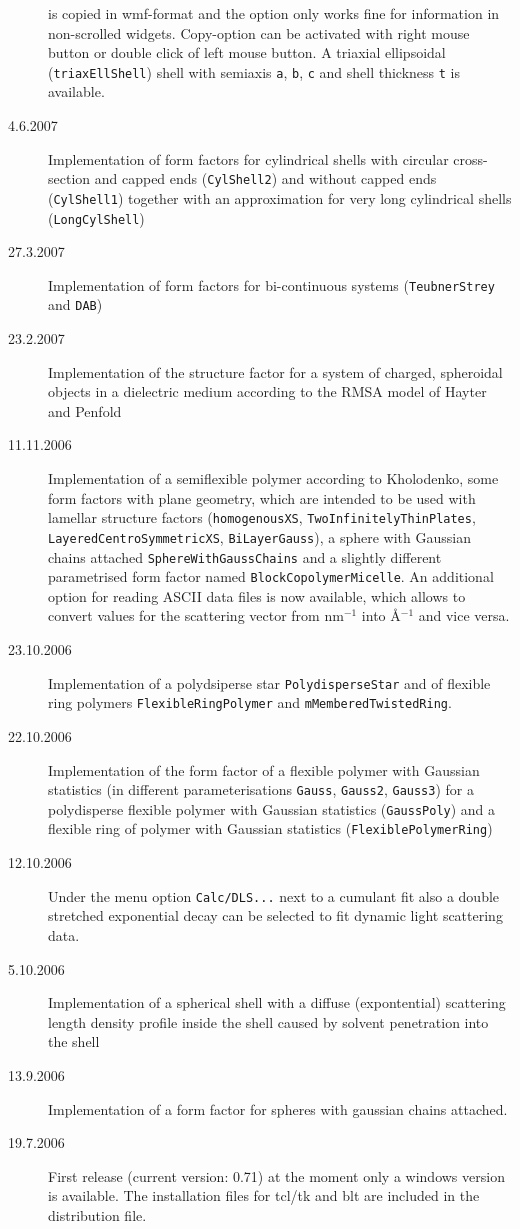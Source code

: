 \begin{description}
    is copied in wmf-format and the option only works fine for information in non-scrolled widgets.
    Copy-option can be activated with right mouse button or double click of left mouse button.
    A triaxial ellipsoidal (\texttt{triaxEllShell}) shell with semiaxis \texttt{a}, \texttt{b}, \texttt{c}
    and shell thickness \texttt{t} is available.
    \item[4.6.2007] Implementation of form factors for cylindrical shells with circular cross-section and capped ends
    (\texttt{CylShell2}) and without capped ends (\texttt{CylShell1}) together with an approximation for very long
    cylindrical shells (\texttt{LongCylShell})
    \item[27.3.2007] Implementation of form factors for bi-continuous systems (\texttt{TeubnerStrey} and \texttt{DAB})
    \item[23.2.2007] Implementation of the structure factor for a system of charged, spheroidal objects in a
    dielectric medium according to the RMSA model of Hayter and Penfold
    \item[11.11.2006]  Implementation of a semiflexible polymer according to Kholodenko,
    some form factors with plane geometry, which are intended to be used with lamellar structure factors
    (\texttt{homogenousXS}, \texttt{TwoInfinitelyThinPlates},
     \texttt{LayeredCentroSymmetricXS}, \texttt{BiLayerGauss}), a sphere with Gaussian chains attached
    \texttt{SphereWithGaussChains} and a slightly different parametrised form factor named
    \texttt{BlockCopolymerMicelle}.
    An additional option for reading ASCII data files is now available,
    which allows to convert values for the scattering vector from
    nm$^{-1}$ into \AA$^{-1}$ and vice versa. \sloppy
    \item[23.10.2006] Implementation of a polydsiperse star \texttt{PolydisperseStar} and
    of flexible ring polymers \texttt{FlexibleRingPolymer} and \texttt{mMemberedTwistedRing}.
    \item[22.10.2006] Implementation of the form factor of a flexible polymer with Gaussian statistics
    (in different parameterisations \verb"Gauss", \verb"Gauss2", \verb"Gauss3") for a polydisperse flexible
    polymer with Gaussian statistics (\verb"GaussPoly") and a flexible ring of polymer with Gaussian statistics
    (\verb"FlexiblePolymerRing")
    \item[12.10.2006] Under the menu option \verb"Calc/DLS..." next to a cumulant fit also
      a double stretched exponential decay can be selected to fit dynamic light scattering data.
    \item[5.10.2006] Implementation of a spherical shell with a diffuse
      (expontential) scattering length density profile inside the shell
      caused by solvent penetration into the shell
    \item[13.9.2006] Implementation of a form factor for spheres
      with gaussian chains attached.
    \item[19.7.2006] First release (current version: 0.71)
      at the moment only a windows version is available. The
      installation files for tcl/tk and blt are included in the
      distribution file.
\end{description}
